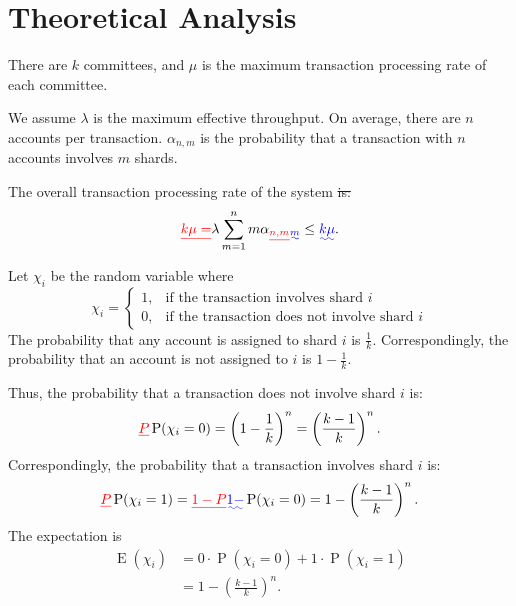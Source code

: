 \documentclass[10pt, conference, letterpaper]{IEEEtran}
\providecommand{\DIFadd}[1]{{\protect\color{blue}\uwave{#1}}} %
\providecommand{\DIFdel}[1]{{\protect\color{red}\sout{#1}}}                      %
\providecommand{\DIFaddbegin}{} %
\providecommand{\DIFaddend}{} %
\providecommand{\DIFdelbegin}{} %
\providecommand{\DIFdelend}{} %
\newcommand{\DIFscaledelfig}{0.5}
\newlength{\DIFdelgraphicswidth} %
\newlength{\DIFdelgraphicsheight} %
\newcommand{\DIFaddincludegraphics}[2][]{{\color{blue}\fbox{\DIFOincludegraphics[#1]{#2}}}} %
\newcommand{\DIFdelincludegraphics}[2][]{%
\sbox{\DIFdelgraphicsbox}{\DIFOincludegraphics[#1]{#2}}%
\settoboxwidth{\DIFdelgraphicswidth}{\DIFdelgraphicsbox} %
\settoboxtotalheight{\DIFdelgraphicsheight}{\DIFdelgraphicsbox} %
\scalebox{\DIFscaledelfig}{%
\parbox[b]{\DIFdelgraphicswidth}{\usebox{\DIFdelgraphicsbox}\\[-\baselineskip] \rule{\DIFdelgraphicswidth}{0em}}\llap{\resizebox{\DIFdelgraphicswidth}{\DIFdelgraphicsheight}{%
\setlength{\unitlength}{\DIFdelgraphicswidth}%
\begin{picture}(1,1)%
\thicklines\linethickness{2pt} %
{\color[rgb]{1,0,0}\put(0,0){\framebox(1,1){}}}%
{\color[rgb]{1,0,0}\put(0,0){\line( 1,1){1}}}%
{\color[rgb]{1,0,0}\put(0,1){\line(1,-1){1}}}%
\end{picture}%
}\hspace*{3pt}}} %
} %
\DeclareRobustCommand{\DIFaddbegin}{\DIFOaddbegin \let\includegraphics\DIFaddincludegraphics} %
\DeclareRobustCommand{\DIFaddend}{\DIFOaddend \let\includegraphics\DIFOincludegraphics} %
\DeclareRobustCommand{\DIFdelbegin}{\DIFOdelbegin \let\includegraphics\DIFdelincludegraphics} %
\DeclareRobustCommand{\DIFdelend}{\DIFOaddend \let\includegraphics\DIFOincludegraphics} %
\begin{document}
\section{Theoretical Analysis}
There are $k$ committees,  and $\mu$ is the maximum transaction processing rate of each committee.

We assume $\lambda$ is the maximum effective throughput. 
On average, there are  $n$ accounts per transaction. \DIFdelbegin \DIFdel{$\alpha_{n,m}$ }\DIFdelend \DIFaddbegin \DIFadd{$\alpha_{m}$ }\DIFaddend is the probability that a transaction with $n$ accounts involves $m$ shards. 

The overall transaction processing rate of the system \DIFdelbegin \DIFdel{is:
}\DIFdelend \DIFaddbegin \DIFadd{should satisfy:
}\DIFaddend \begin{equation} \label{equ1}
	\DIFdelbegin \DIFdel{k\mu=}\DIFdelend \lambda \sum_{m=1}^n m \alpha\DIFdelbegin \DIFdel{_{n,m}}\DIFdelend \DIFaddbegin \DIFadd{_{m} }\le \DIFadd{k\mu}\DIFaddend . 	
\end{equation}


Let $ \chi_i$ be the random variable where
\begin{equation}
	\chi_i=
	\begin{cases} 
		1, & \mbox{if the transaction involves  shard $i$}          \\
		0, & \mbox{if the transaction does not involve   shard $i$}
	\end{cases}
\end{equation}
The probability that any account is assigned to shard $i$ is $\frac{1}{k}$. Correspondingly, the probability that an account is not assigned to $i$ is $1-\frac{1}{k}$. 

Thus, the probability that a transaction does not involve shard $i$ is:
\begin{equation}
	\DIFdelbegin \DIFdel{P}\DIFdelend \DIFaddbegin \operatorname{P}\DIFaddend ( \chi_i=0)=\left(1-\frac{1}{k}\right)^n=\left(\frac{k-1}{k}\right)^n.
\end{equation}
Correspondingly, the probability that a transaction involves shard $i$ is:
\begin{equation}
	\DIFdelbegin \DIFdel{P}\DIFdelend \DIFaddbegin \operatorname{P}\DIFaddend ( \chi_i=1)=\DIFdelbegin \DIFdel{1-P}\DIFdelend \DIFaddbegin \DIFadd{1-}\operatorname{P}\DIFaddend ( \chi_i=0)=1-\left(\frac{k-1}{k}\right)^n.
\end{equation}
The expectation is
\begin{equation}
	\DIFdelbegin %
\DIFdelend \DIFaddbegin \begin{split}
		\operatorname{E}( \chi_i )&= 0\cdot \operatorname{P}( \chi_i=0)+1 \cdot \operatorname{P}( \chi_i=1)\\
		&=1-\left(\frac{k-1}{k}\right)^n.
	\end{split}\DIFaddend 
\end{equation}
\end{document}
